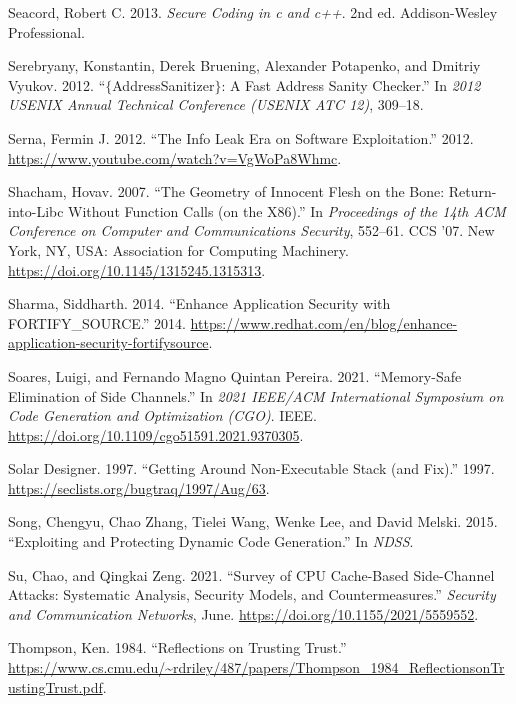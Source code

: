\documentclass[
  a4paper,
]{report}
\newlength{\cslhangindent}
\newenvironment{CSLReferences}[2] %
{\begin{list}{}{%
	\setlength{\itemindent}{0pt}
	\setlength{\leftmargin}{0pt}
	\setlength{\parsep}{0pt}
	\ifodd #1
	\setlength{\leftmargin}{\cslhangindent}
	\setlength{\itemindent}{-1\cslhangindent}
	\fi
	\setlength{\itemsep}{#2\baselineskip}}}
{\end{list}}
\begin{document}
\begin{CSLReferences}{1}{0}
Seacord, Robert C. 2013. \emph{Secure Coding in c and c++}. 2nd ed.
Addison-Wesley Professional.

Serebryany, Konstantin, Derek Bruening, Alexander Potapenko, and Dmitriy
Vyukov. 2012. {``\(\{\)AddressSanitizer\(\}\): A Fast Address Sanity
Checker.''} In \emph{2012 USENIX Annual Technical Conference (USENIX ATC
12)}, 309--18.

Serna, Fermin J. 2012. {``The Info Leak Era on Software Exploitation.''}
2012. \url{https://www.youtube.com/watch?v=VgWoPa8Whmc}.

Shacham, Hovav. 2007. {``The Geometry of Innocent Flesh on the Bone:
Return-into-Libc Without Function Calls (on the X86).''} In
\emph{Proceedings of the 14th ACM Conference on Computer and
Communications Security}, 552--61. CCS '07. New York, NY, USA:
Association for Computing Machinery.
\url{https://doi.org/10.1145/1315245.1315313}.

Sharma, Siddharth. 2014. {``Enhance Application Security with
FORTIFY\_SOURCE.''} 2014.
\url{https://www.redhat.com/en/blog/enhance-application-security-fortifysource}.

Soares, Luigi, and Fernando Magno Quintan Pereira. 2021. {``Memory-Safe
Elimination of Side Channels.''} In \emph{2021 {IEEE}/{ACM}
International Symposium on Code Generation and Optimization ({CGO})}.
{IEEE}. \url{https://doi.org/10.1109/cgo51591.2021.9370305}.

Solar Designer. 1997. {``Getting Around Non-Executable Stack (and
Fix).''} 1997. \url{https://seclists.org/bugtraq/1997/Aug/63}.

Song, Chengyu, Chao Zhang, Tielei Wang, Wenke Lee, and David Melski.
2015. {``Exploiting and Protecting Dynamic Code Generation.''} In
\emph{NDSS}.

Su, Chao, and Qingkai Zeng. 2021. {``Survey of {CPU} Cache-Based
Side-Channel Attacks: Systematic Analysis, Security Models, and
Countermeasures.''} \emph{Security and Communication Networks}, June.
\url{https://doi.org/10.1155/2021/5559552}.

Thompson, Ken. 1984. {``Reflections on Trusting Trust.''}
\url{https://www.cs.cmu.edu/~rdriley/487/papers/Thompson_1984_ReflectionsonTrustingTrust.pdf}.


\end{CSLReferences}
\end{document}
